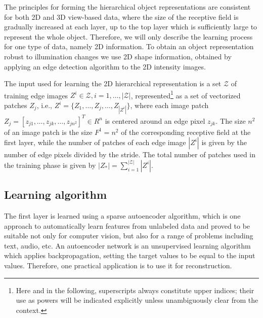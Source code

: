 \documentclass[conference]{IEEEtran}
\begin{document}
The principles for forming the hierarchical object representations are consistent for both 2D and 3D view-based data, where the size of the receptive field is gradually increased at each layer, up to the top layer which is sufficiently large to represent the whole object. Therefore, we will only describe the learning process for one type of data, namely 2D information. To obtain an object representation robust to illumination changes we use 2D shape information, obtained by applying an edge detection algorithm to the 2D intensity images.

The input used for learning the 2D hierarchical representation is a set $\mathcal{Z}$ of training edge images $Z^i \in \mathcal{Z}, i=1,\ldots,|\mathcal{Z}|$, represented\footnote{Here and in the following, superscripts always constitute upper indices; their use as powers will be indicated explicitly unless unambiguously clear from the context.} as a set of vectorized patches $Z_j$, i.e., $Z^i=\{Z_1,\ldots,Z_j,\ldots,Z_{|Z^i|}\}$, where each image patch
$Z_j=[z_{j1},\ldots,z_{jk},\ldots,z_{jn^2}]^T \in R^n$ is centered around an edge pixel $z_{jk}$. The size $n^2$ of an image patch is the size $F^1=n^2$ of the corresponding receptive field at the first layer, while the number of patches of each edge image $|Z^i|$ is given by the number of edge pixels divided by the stride. The total number of patches used in the training phase is given by $|Z_*|=\sum_{i=1}^{|\mathcal{Z}|} |Z^i|$.

\subsection{Learning algorithm} 

The first layer is learned using a sparse autoencoder algorithm, which is one approach to automatically learn features from unlabeled data and proved to be suitable not only for computer vision, but also for a range of problems including text, audio, etc. An autoencoder network is an unsupervised learning algorithm which applies backpropagation, setting the target values to be equal to the input values. Therefore, one practical application is to use it for reconstruction. 

\end{document}
